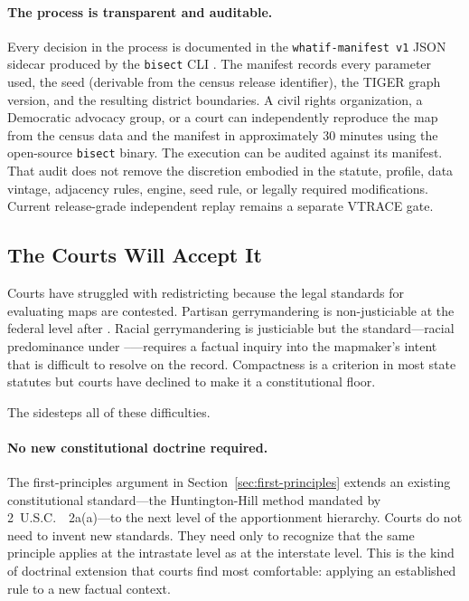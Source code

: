 \paragraph{The process is transparent and auditable.}
Every decision in the \ar{} process is documented in the \texttt{whatif-manifest
v1} JSON sidecar produced by the \texttt{bisect} CLI \citep{b0paper}.
The manifest records every parameter used, the seed (derivable from the
census release identifier), the TIGER graph version, and the resulting
district boundaries.
A civil rights organization, a Democratic advocacy group, or a court
can independently reproduce the map from the census data and the
manifest in approximately 30 minutes using the open-source \texttt{bisect}
binary.
The execution can be audited against its manifest. That audit does not remove
the discretion embodied in the statute, profile, data vintage, adjacency
rules, engine, seed rule, or legally required modifications. Current
release-grade independent replay remains a separate VTRACE gate.

\subsection{The Courts Will Accept It}

Courts have struggled with redistricting because the legal standards for
evaluating maps are contested.
Partisan gerrymandering is non-justiciable at the federal level after \rucho{}.
Racial gerrymandering is justiciable but the standard---racial predominance
under \shaw{}--\miller{}---requires a factual inquiry into the mapmaker's
intent that is difficult to resolve on the record.
Compactness is a criterion in most state statutes but courts have declined
to make it a constitutional floor.

The \dia{} sidesteps all of these difficulties.

\paragraph{No new constitutional doctrine required.}
The first-principles argument in Section~\ref{sec:first-principles} extends
an existing constitutional standard---the Huntington-Hill method mandated by
2~U.S.C.~\usca{}~2a(a)---to the next level of the apportionment hierarchy.
Courts do not need to invent new standards.
They need only to recognize that the same principle applies at the intrastate
level as at the interstate level.
This is the kind of doctrinal extension that courts find most comfortable:
applying an established rule to a new factual context.

